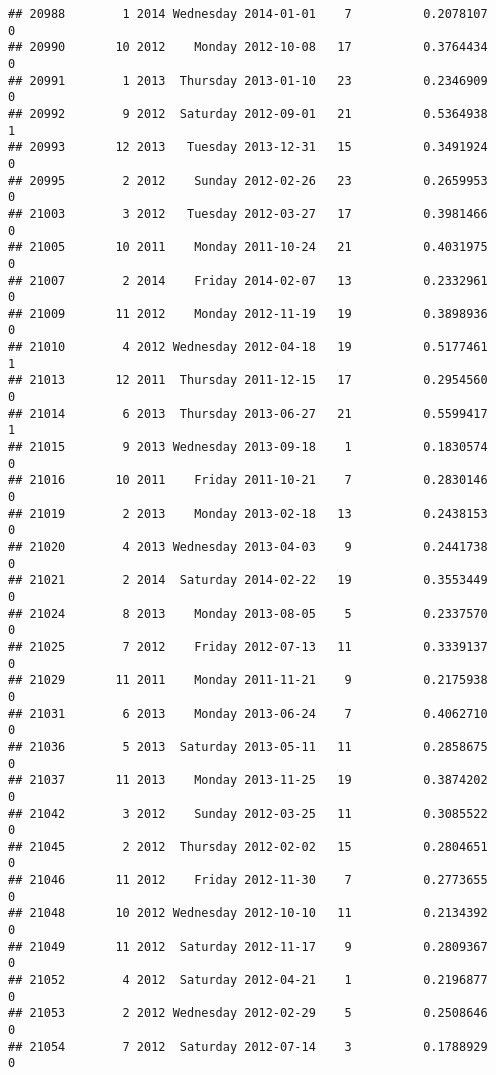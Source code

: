 \documentclass[
]{article}
\begin{document}
\begin{verbatim}
## 20988        1 2014 Wednesday 2014-01-01    7          0.2078107             0
## 20990       10 2012    Monday 2012-10-08   17          0.3764434             0
## 20991        1 2013  Thursday 2013-01-10   23          0.2346909             0
## 20992        9 2012  Saturday 2012-09-01   21          0.5364938             1
## 20993       12 2013   Tuesday 2013-12-31   15          0.3491924             0
## 20995        2 2012    Sunday 2012-02-26   23          0.2659953             0
## 21003        3 2012   Tuesday 2012-03-27   17          0.3981466             0
## 21005       10 2011    Monday 2011-10-24   21          0.4031975             0
## 21007        2 2014    Friday 2014-02-07   13          0.2332961             0
## 21009       11 2012    Monday 2012-11-19   19          0.3898936             0
## 21010        4 2012 Wednesday 2012-04-18   19          0.5177461             1
## 21013       12 2011  Thursday 2011-12-15   17          0.2954560             0
## 21014        6 2013  Thursday 2013-06-27   21          0.5599417             1
## 21015        9 2013 Wednesday 2013-09-18    1          0.1830574             0
## 21016       10 2011    Friday 2011-10-21    7          0.2830146             0
## 21019        2 2013    Monday 2013-02-18   13          0.2438153             0
## 21020        4 2013 Wednesday 2013-04-03    9          0.2441738             0
## 21021        2 2014  Saturday 2014-02-22   19          0.3553449             0
## 21024        8 2013    Monday 2013-08-05    5          0.2337570             0
## 21025        7 2012    Friday 2012-07-13   11          0.3339137             0
## 21029       11 2011    Monday 2011-11-21    9          0.2175938             0
## 21031        6 2013    Monday 2013-06-24    7          0.4062710             0
## 21036        5 2013  Saturday 2013-05-11   11          0.2858675             0
## 21037       11 2013    Monday 2013-11-25   19          0.3874202             0
## 21042        3 2012    Sunday 2012-03-25   11          0.3085522             0
## 21045        2 2012  Thursday 2012-02-02   15          0.2804651             0
## 21046       11 2012    Friday 2012-11-30    7          0.2773655             0
## 21048       10 2012 Wednesday 2012-10-10   11          0.2134392             0
## 21049       11 2012  Saturday 2012-11-17    9          0.2809367             0
## 21052        4 2012  Saturday 2012-04-21    1          0.2196877             0
## 21053        2 2012 Wednesday 2012-02-29    5          0.2508646             0
## 21054        7 2012  Saturday 2012-07-14    3          0.1788929             0

\end{verbatim}
\end{document}
